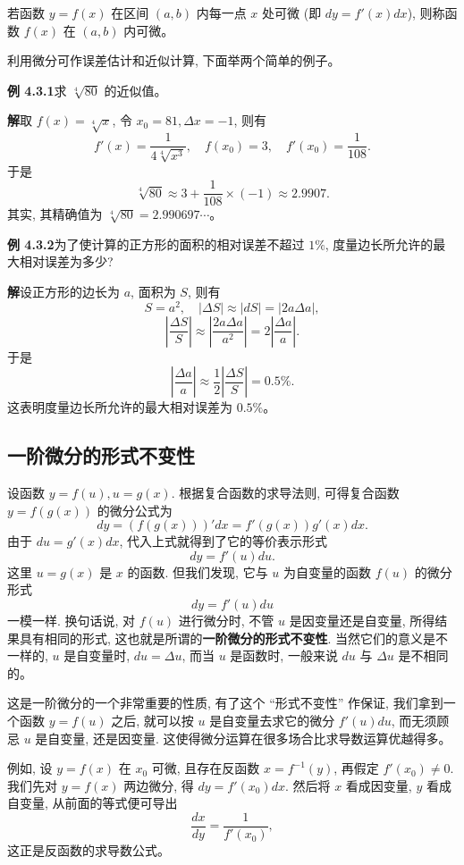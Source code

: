 \documentclass[UTF8, 12pt, fontset=fandol, oneside]{ctexart}
\begin{document}
若函数 $y=f(x)$ 在区间 $(a,b)$ 内每一点 $x$ 处可微 (即 $dy=f'(x)dx$), 则称函数 $f(x)$ 在 $(a,b)$ 内可微。

利用微分可作误差估计和近似计算, 下面举两个简单的例子。

\noindent\textbf{例 4.3.1}\quad 求 $\sqrt[4]{80}$ 的近似值。

\noindent\textbf{解}\quad 取 $f(x)=\sqrt[4]{x}$, 令 $x_0=81,\Delta x=-1$, 则有
\[
  f'(x)=\frac{1}{4\sqrt[4]{x^3}},
  \quad
  f(x_0)=3,
  \quad
  f'(x_0)=\frac{1}{108}.
\]
于是
\[
  \sqrt[4]{80}\approx 3+\frac{1}{108}\times(-1)\approx2.9907.
\]
其实, 其精确值为 $\sqrt[4]{80}=2.990697\cdots$。

\noindent\textbf{例 4.3.2}\quad 为了使计算的正方形的面积的相对误差不超过 $1\%$, 度量边长所允许的最大相对误差为多少?

\noindent\textbf{解}\quad 设正方形的边长为 $a$, 面积为 $S$, 则有
\[
  S=a^2,\quad |\Delta S|\approx |dS|=|2a\Delta a|,
\]
\[
  \left|\frac{\Delta S}{S}\right|
  \approx
  \left|\frac{2a\Delta a}{a^2}\right|
  =
  2\left|\frac{\Delta a}{a}\right|.
\]
于是
\[
  \left|\frac{\Delta a}{a}\right|
  \approx
  \frac{1}{2}\left|\frac{\Delta S}{S}\right|
  =
  0.5\%.
\]
这表明度量边长所允许的最大相对误差为 $0.5\%$。

\subsection{一阶微分的形式不变性}

设函数 $y=f(u),u=g(x)$. 根据复合函数的求导法则, 可得复合函数 $y=f(g(x))$ 的微分公式为
\[
  dy=(f(g(x)))'dx=f'(g(x))g'(x)dx.
\]
由于 $du=g'(x)dx$, 代入上式就得到了它的等价表示形式
\[
  dy=f'(u)du.
\]
这里 $u=g(x)$ 是 $x$ 的函数. 但我们发现, 它与 $u$ 为自变量的函数 $f(u)$ 的微分形式
\[
  dy=f'(u)du
\]
一模一样. 换句话说, 对 $f(u)$ 进行微分时, 不管 $u$ 是因变量还是自变量, 所得结果具有相同的形式, 这也就是所谓的\textbf{一阶微分的形式不变性}. 当然它们的意义是不一样的, $u$ 是自变量时, $du=\Delta u$, 而当 $u$ 是函数时, 一般来说 $du$ 与 $\Delta u$ 是不相同的。

这是一阶微分的一个非常重要的性质, 有了这个 ``形式不变性'' 作保证, 我们拿到一个函数 $y=f(u)$ 之后, 就可以按 $u$ 是自变量去求它的微分 $f'(u)du$, 而无须顾忌 $u$ 是自变量, 还是因变量. 这使得微分运算在很多场合比求导数运算优越得多。

例如, 设 $y=f(x)$ 在 $x_0$ 可微, 且存在反函数 $x=f^{-1}(y)$, 再假定 $f'(x_0)\ne0$. 我们先对 $y=f(x)$ 两边微分, 得 $dy=f'(x_0)dx$. 然后将 $x$ 看成因变量, $y$ 看成自变量, 从前面的等式便可导出
\[
  \frac{dx}{dy}=\frac{1}{f'(x_0)},
\]
这正是反函数的求导数公式。
\end{document}
